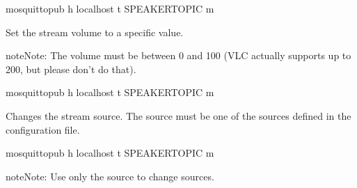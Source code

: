 \documentclass[letterpaper,10pt,english]{sphinxmanual}
\begin{document}
\begin{fulllineitems}
\begin{fulllineitems}
\begin{sphinxVerbatim}[commandchars=\\\{\}]
mosquitto\PYGZus{}pub \PYGZhy{}h localhost \PYGZhy{}t \PYGZpc{}SPEAKER\PYGZus{}TOPIC \PYGZhy{}m 
\end{sphinxVerbatim}

\end{fulllineitems}



\begin{fulllineitems}

\pysigstartsignatures
{}
\pysigstopsignatures
\sphinxAtStartPar
Set the stream volume to a specific value.

\begin{sphinxadmonition}{note}{Note:}
\sphinxAtStartPar
The volume must be between 0 and 100 (VLC actually supports up to 200, but please don’t do that).
\end{sphinxadmonition}

\begin{sphinxVerbatim}[commandchars=\\\{\}]
mosquitto\PYGZus{}pub \PYGZhy{}h localhost \PYGZhy{}t \PYGZpc{}SPEAKER\PYGZus{}TOPIC \PYGZhy{}m 
\end{sphinxVerbatim}

\end{fulllineitems}



\begin{fulllineitems}

\pysigstartsignatures
{}
\pysigstopsignatures
\sphinxAtStartPar
Changes the stream source.
The source must be one of the sources defined in the configuration file.

\begin{sphinxVerbatim}[commandchars=\\\{\}]
mosquitto\PYGZus{}pub \PYGZhy{}h localhost \PYGZhy{}t \PYGZpc{}SPEAKER\PYGZus{}TOPIC \PYGZhy{}m 
\end{sphinxVerbatim}

\begin{sphinxadmonition}{note}{Note:}
\sphinxAtStartPar
Use only the source  to change sources.
\end{sphinxadmonition}


\end{fulllineitems}
\end{fulllineitems}
\end{document}
